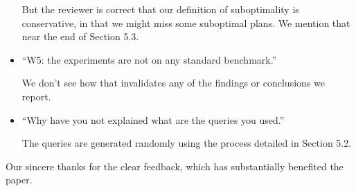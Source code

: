 \documentclass{sig-alternate}
\begin{document}
\begin{itemize}
But the reviewer is correct that our definition of suboptimality is
conservative, in that we might miss some suboptimal plans. We mention that
near the end of Section 5.3.

\item ``W5: the experiments are not on any standard benchmark.''

We don't see how that invalidates any of the findings or conclusions we
report.

\item ``Why have you not explained what are the queries you used.''

The queries are generated randomly using the process detailed in Section 5.2.
\end{itemize}

\vspace{2ex}

Our sincere thanks for the clear feedback, which has substantially benefited
the paper.
\end{document}
